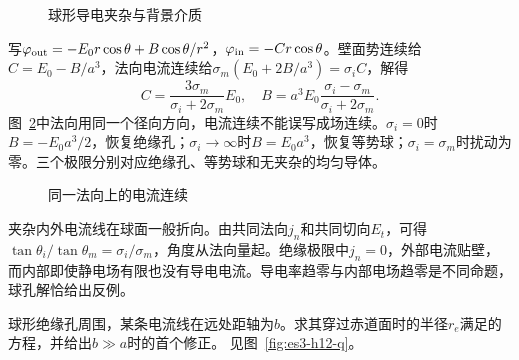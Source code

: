 \begin{figure}[H]\centering
{}
\caption{球形导电夹杂与背景介质}\label{fig:es3-h11-q}
\end{figure}
\begin{solution}
写$\varphi_{\rm out}=-E_0r\cos\theta+B\cos\theta/r^2$，$\varphi_{\rm in}=-Cr\cos\theta$。壁面势连续给$C=E_0-B/a^3$，法向电流连续给$\sigma_m(E_0+2B/a^3)=\sigma_iC$，解得
\[C=\frac{3\sigma_m}{\sigma_i+2\sigma_m}E_0,\quad B=a^3E_0\frac{\sigma_i-\sigma_m}{\sigma_i+2\sigma_m}.
\]
图~\ref{fig:es3-h11-s}中法向用同一个径向方向，电流连续不能误写成场连续。$\sigma_i=0$时$B=-E_0a^3/2$，恢复绝缘孔；$\sigma_i\to\infty$时$B=E_0a^3$，恢复等势球；$\sigma_i=\sigma_m$时扰动为零。三个极限分别对应绝缘孔、等势球和无夹杂的均匀导体。
\begin{figure}[H]\centering
{}
\caption{同一法向上的电流连续}\label{fig:es3-h11-s}
\end{figure}


夹杂内外电流线在球面一般折向。由共同法向$j_n$和共同切向$E_t$，可得$\tan\theta_i/\tan\theta_m=\sigma_i/\sigma_m$，角度从法向量起。绝缘极限中$j_n=0$，外部电流贴壁，而内部即使静电场有限也没有导电电流。导电率趋零与内部电场趋零是不同命题，球孔解恰给出反例。
\end{solution}

\begin{exercise}[球孔电流线的远处偏移]\label{ex:es3-h12}
球形绝缘孔周围，某条电流线在远处距轴为$b$。求其穿过赤道面时的半径$r_e$满足的方程，并给出$b\gg a$时的首个修正。 见图~\ref{fig:es3-h12-q}。
\end{exercise}

